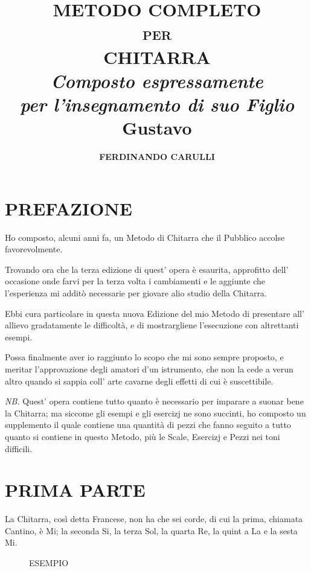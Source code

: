 \documentclass[a4paper]{book}
\title{%
  \Huge\textbf{METODO COMPLETO}\\[-1ex]
  \textsc{\large per}\\[-.5ex]
  \textbf{CHITARRA}\\[.5ex]
  \textit{\Large Composto espressamente\\
    per l'insegnamento di suo Figlio\\[.5ex]}
  \huge\textbf{Gustavo}}
\author{\Huge\bfseries FERDINANDO CARULLI}
\date{}
\begin{document}
\frontmatter

\maketitle
\thispagestyle{empty}
\cleardoublepage

\part*{PREFAZIONE}

Ho composto, alcuni anni fa, un Metodo di Chitarra che il Pubblico accolse favorevolmente.

Trovando ora che la terza edizione di quest' opera è esaurita, approfitto dell' occasione onde farvi per la terza volta i cambiamenti e le aggiunte che l'esperienza mi additò necessarie per giovare alio studio della Chitarra.

Ebbi cura particolare in questa nuova Edizione del mio Metodo di presentare all' allievo gradatamente le difficoltà, e di mostrargliene l'esecuzione con altrettanti esempi.

Possa finalmente aver io raggiunto lo scopo che mi sono sempre proposto, e meritar l'approvazione degli amatori d'un istrumento, che non la cede a verun altro quando si sappia coll' arte cavarne degli effetti di cui è suscettibile.

\textit{NB\@.}  Quest' opera contiene tutto quanto è necessario per imparare a suonar bene la Chitarra; ma siccome gli esempi e gli esercizj ne sono succinti, ho composto un supplemento il quale contiene una quantità di pezzi che fanno seguito a tutto quanto si contiene in questo Metodo, più le Scale, Esercizj e Pezzi nei toni difficili.
\clearpage
\thispagestyle{empty}

\mainmatter

\renewcommand{\contentsname}{\Large\centering QUESTO METODO È DIVISO
  COME SEGUE.}
\tableofcontents
\thispagestyle{empty}
\clearpage
\thispagestyle{empty}

\part{PRIMA PARTE}

La Chitarra, così detta Francese, non ha che sei corde, di cui la prima, chiamata Cantino, è Mi; la seconda Si, la terza Sol, la quarta Re, la quint a La e la sesta Mi.

\begin{figure}[h]
  \centering
  \caption{ESEMPIO}
  \label{fig:strings}
\end{figure}
\end{document}
